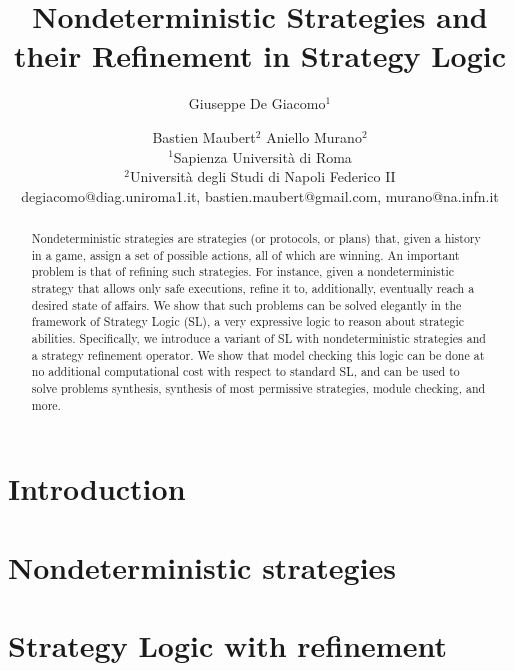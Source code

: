 \documentclass{article}
\title{Nondeterministic Strategies and their Refinement in Strategy Logic}
\author{
 Giuseppe De Giacomo$^1$\and
 Bastien Maubert$^2$\And
  Aniello Murano$^2$\\
 	\affiliations
 	$^1$Sapienza Università di Roma\\
 	$^2$Universit\`a degli Studi di Napoli Federico II\\
 	\emails
 	degiacomo@diag.uniroma1.it,
 	bastien.maubert@gmail.com,
 	murano@na.infn.it
}
\theoremstyle{definition}
\theoremstyle{plain}
\begin{document}
\maketitle

\begin{abstract}
  Nondeterministic strategies are strategies (or protocols, or plans)
  that, given a history in a game, assign a set of possible actions,
  all of which are winning.  An important problem is that of
  refining such strategies. For instance, given a nondeterministic strategy that allows
only safe executions, 
 refine it to, additionally, eventually reach a desired state of affairs. We show that such problems can
  be solved elegantly in the framework of Strategy Logic (SL), a very
  expressive logic to reason about strategic abilities. Specifically, we
  introduce a variant of SL with nondeterministic strategies 
 and a strategy refinement operator. We 
  show that model checking this logic can be done at 
no additional  computational cost with respect to standard SL, and can
be used to solve problems synthesis, synthesis of most permissive strategies, module checking, and more.
\end{abstract}

\section{Introduction}
\label{section:introduction}


\section{Nondeterministic strategies}
\label{section:refinement}





\section{Strategy Logic with refinement}
\label{section:SL}



% 
\end{document}
